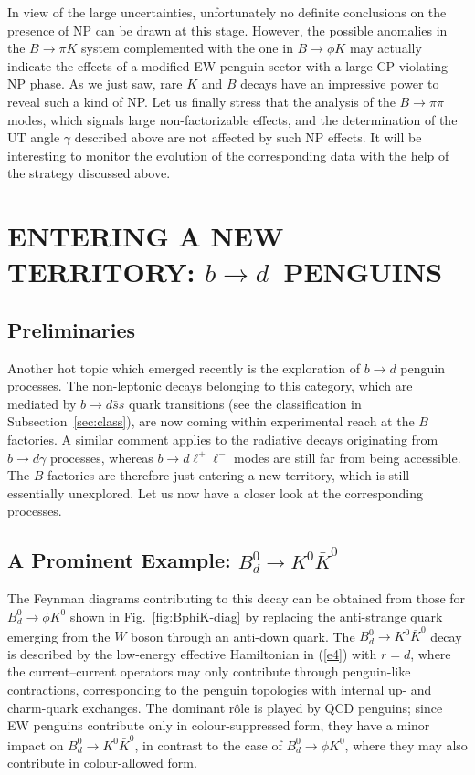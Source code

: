 \documentclass[11pt]{cernrep}
\begin{document}
In view of the large uncertainties, unfortunately no definite conclusions on the
presence of NP can be drawn at this stage. However, the possible anomalies
in the $B\to\pi K$ system complemented with the one in $B\to\phi K$ may actually
indicate the effects of a modified EW penguin sector with a large CP-violating
NP phase. As we just saw, rare $K$ and $B$ decays have an impressive power
to reveal such a kind of NP. Let us finally stress that the analysis of the $B\to\pi\pi$
modes, which signals large non-factorizable effects, and the determination of the 
UT angle $\gamma$ described above are not affected by such NP effects. It will 
be interesting to monitor the evolution of the corresponding data with the help
of the strategy discussed above.



%
%
%
\section{ENTERING A NEW TERRITORY: 
\boldmath$b\to d$\unboldmath~PENGUINS}\label{sec:bd-pengs}
\setcounter{equation}{0}
%
%
%
\subsection{Preliminaries}
%
%
%
Another hot topic which emerged recently is the exploration of 
$b\to d$ penguin processes. The non-leptonic decays belonging
to this category, which are mediated by $b\to d \bar s s$ quark transitions 
(see the classification in Subsection~\ref{sec:class}), are now coming 
within experimental reach at the $B$ factories. A similar comment applies 
to the radiative decays originating from $b\to d\gamma$ processes, whereas
$b\to d\ell^+\ell^-$ modes are still far from being accessible. The $B$ factories
are therefore just entering a new territory, which is still essentially unexplored.
Let us now have a closer look at the corresponding processes.

%
%
%
\boldmath
\subsection{A Prominent Example: $B^0_d\to K^0\bar K^0$}
\unboldmath
%
%
%
The Feynman diagrams contributing to this decay can 
be obtained from those for $B^0_d\to\phi K^0$ shown in 
Fig.~\ref{fig:BphiK-diag} by replacing the anti-strange quark emerging from the 
$W$ boson through an anti-down quark. The $B^0_d\to K^0\bar K^0$ 
decay is described by the low-energy effective Hamiltonian in (\ref{e4}) with $r=d$, 
where the current--current operators may only contribute  through penguin-like 
contractions, corresponding to the penguin topologies with internal up- and
charm-quark exchanges. The dominant r\^ole is played by QCD penguins; 
since EW penguins contribute only in colour-suppressed form, they have a minor 
impact on $B^0_d\to K^0\bar K^0$, in contrast to the case of $B^0_d\to\phi K^0$,
where they may also contribute in colour-allowed form. 
\end{document}
